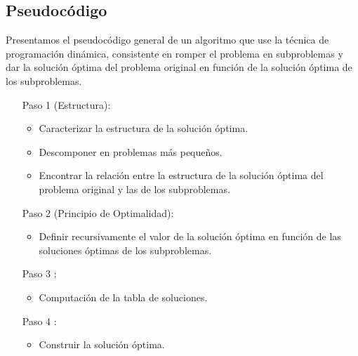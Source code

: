\documentclass[AL.tex]{subfiles}
\begin{document}
\subsection{Pseudocódigo}
Presentamos el pseudocódigo general de un algoritmo que use la técnica de programación dinámica, consistente en romper el problema en subproblemas y dar la solución óptima del problema original en función de la solución óptima de los subproblemas.
\begin{enumerate}
\item[Paso 1] (Estructura):
\begin{itemize}
\item Caracterizar la estructura de la solución óptima.
\item Descomponer en problemas más pequeños.
\item Encontrar la relación entre la estructura de la solución óptima del problema original y las de los subproblemas.
\end{itemize}
\item[Paso 2] (Principio de Optimalidad):
\begin{itemize}
\item Definir recursivamente el valor de la solución óptima en función de las soluciones óptimas de los subproblemas. 
\end{itemize}
\item[Paso 3]:
\begin{itemize}
\item Computación de la tabla de soluciones.
\end{itemize}
\item[Paso 4]:
\begin{itemize}
\item Construir la solución óptima. 
\end{itemize}
\end{enumerate}
\end{document}
